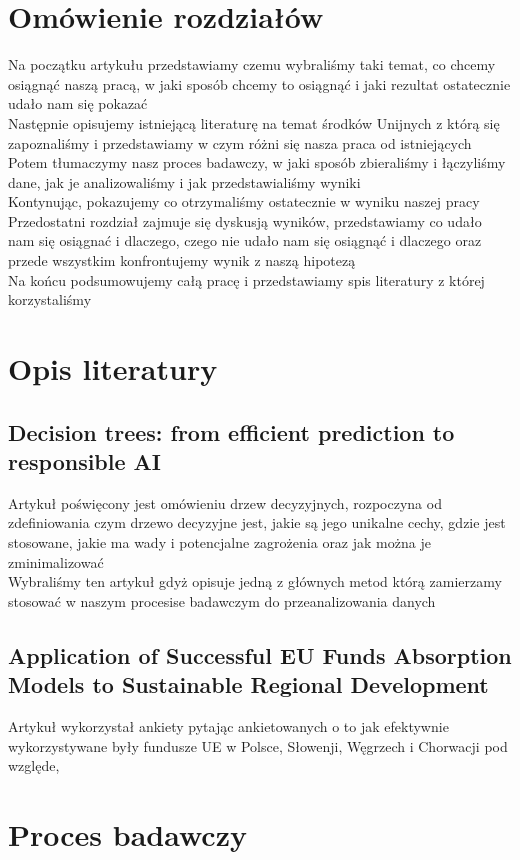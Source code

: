 \documentclass[12pt]{article}
\begin{document}
\section{Omówienie rozdziałów}
Na początku artykułu przedstawiamy czemu wybraliśmy taki temat, co chcemy osiągnąć naszą pracą, w jaki sposób chcemy to osiągnąć i jaki rezultat ostatecznie udało nam się pokazać \\  
Następnie opisujemy istniejącą literaturę na temat środków Unijnych z którą się zapoznaliśmy i przedstawiamy w czym różni się nasza praca od istniejących \\ 
Potem tłumaczymy nasz proces badawczy, w jaki sposób zbieraliśmy i łączyliśmy dane, jak je analizowaliśmy i jak przedstawialiśmy wyniki \\ 
Kontynując, pokazujemy co otrzymaliśmy ostatecznie w wyniku naszej pracy \\ 
Przedostatni rozdział zajmuje się dyskusją wyników, przedstawiamy co udało nam się osiągnać i dlaczego, czego nie udało nam się osiągnąć i dlaczego oraz przede wszystkim konfrontujemy wynik z naszą hipotezą \\ 
Na końcu podsumowujemy całą pracę i przedstawiamy spis literatury z której korzystaliśmy

\section{Opis literatury}
\subsection{Decision trees: from efficient prediction to responsible AI \cite{4}}
Artykuł poświęcony jest omówieniu drzew decyzyjnych, rozpoczyna od zdefiniowania czym drzewo decyzyjne jest, jakie są jego unikalne cechy, gdzie jest stosowane, jakie ma wady i potencjalne zagrożenia oraz jak można je zminimalizować \\ 
Wybraliśmy ten artykuł gdyż opisuje jedną z głównych metod którą zamierzamy stosować w naszym procesise badawczym do przeanalizowania danych 
\subsection{Application of Successful EU Funds Absorption Models to Sustainable Regional Development \cite{5}}
Artykuł wykorzystał ankiety pytając ankietowanych o to jak efektywnie wykorzystywane były fundusze UE w Polsce, Słowenji, Węgrzech i Chorwacji pod względe, 
\section{Proces badawczy}
\end{document}
